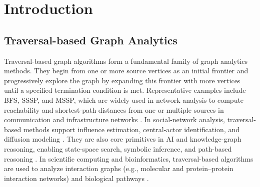 \section{Introduction}
\subsection{Traversal-based Graph Analytics}
\label{subsec:intro-traversal}
Traversal-based graph algorithms form a fundamental family of graph analytics methods. 
They begin from one or more source vertices as an initial frontier and progressively explore the graph by expanding this frontier with more vertices until a specified termination condition is met.
Representative examples include BFS, SSSP, and MSSP, which are widely used in network analysis to compute reachability and shortest-path distances from one or multiple sources in communication and infrastructure networks \cite{hoefler2009optimized, guimera2005worldwide, zhan1998shortest}. 
In social-network analysis, traversal-based methods support influence estimation, central-actor identification, and diffusion modeling \cite{basuchowdhuri2019fast, pv2024degree, byun2019chronograph}. 
They are also core primitives in AI and knowledge-graph reasoning, enabling state-space search, symbolic inference, and path-based reasoning \cite{russell1995modern, osipjan2025graphtrace, canesche2020traversal, jia2025neural}. 
In scientific computing and bioinformatics, traversal-based algorithms are used to analyze interaction graphs (e.g., molecular and protein–protein interaction networks) and biological pathways \cite{alon2007network, rubel2020augmenting, franzese2019hypergraph}.

